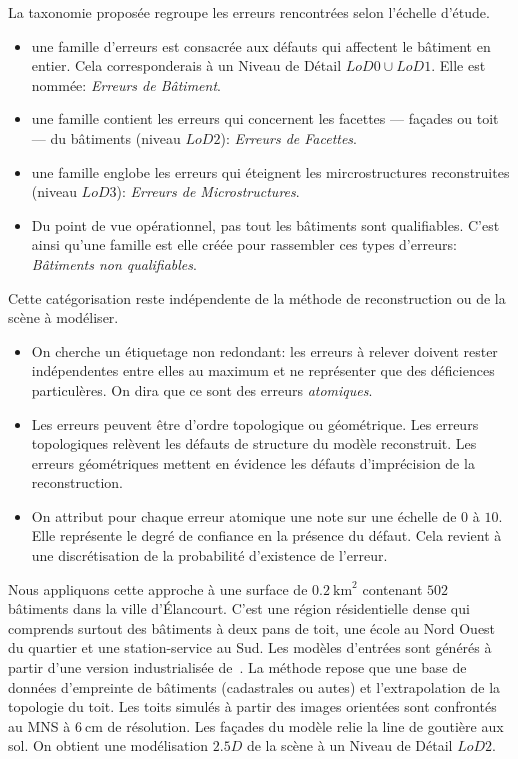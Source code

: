 \documentclass[a4paper,french]{article}
\begin{document}
    La taxonomie proposée regroupe les erreurs rencontrées selon l'échelle d'étude.
    \begin{itemize}
        \item une famille d'erreurs est consacrée aux défauts qui affectent le bâtiment en entier. Cela corresponderais à un Niveau de Détail $LoD 0\cup LoD 1$. Elle est nommée: \emph{Erreurs de Bâtiment}.
        \item une famille contient les erreurs qui concernent les facettes --- façades ou toit --- du bâtiments (niveau $LoD 2$): \emph{Erreurs de Facettes}.
        \item une famille englobe les erreurs qui éteignent les mircrostructures reconstruites (niveau $LoD 3$): \emph{Erreurs de Microstructures}.
        \item Du point de vue opérationnel, pas tout les bâtiments sont qualifiables. C'est ainsi qu'une famille est elle créée pour rassembler ces types d'erreurs: \emph{Bâtiments non qualifiables}.
    \end{itemize}

    Cette catégorisation reste indépendente de la méthode de reconstruction ou de la scène à modéliser.
    \begin{itemize}
        \item On cherche un étiquetage non redondant: les erreurs à relever doivent rester indépendentes entre elles au maximum et ne représenter que des déficiences particulères. On dira que ce sont des erreurs \emph{atomiques}.
        \item Les erreurs peuvent être d'ordre topologique ou géométrique. Les erreurs topologiques relèvent les défauts de structure du modèle reconstruit. Les erreurs géométriques mettent en évidence les défauts d'imprécision de la reconstruction.
        \item On attribut pour chaque erreur atomique une note sur une échelle de $0$ à $10$. Elle représente le degré de confiance en la présence du défaut. Cela revient à une discrétisation de la probabilité d'existence de l'erreur.
    \end{itemize}

    Nous appliquons cette approche à une surface de $\SI{0.2}{\km \squared}$ contenant $502$ bâtiments dans la ville d'\'Elancourt. C'est une région résidentielle dense qui comprends surtout des bâtiments à deux pans de toit, une école au Nord Ouest du quartier et une station-service au Sud. Les modèles d'entrées sont générés à partir d'une version industrialisée de~\cite{Durupt2006}. La méthode repose que une base de données d'empreinte de bâtiments (cadastrales ou autes) et l'extrapolation de la topologie du toit. Les toits simulés à partir des images orientées sont confrontés au MNS à $\SI{6}{\cm}$ de résolution. Les façades du modèle relie la line de goutière aux sol. On obtient une modélisation $2.5D$ de la scène à un Niveau de Détail $LoD 2$.
\end{document}
